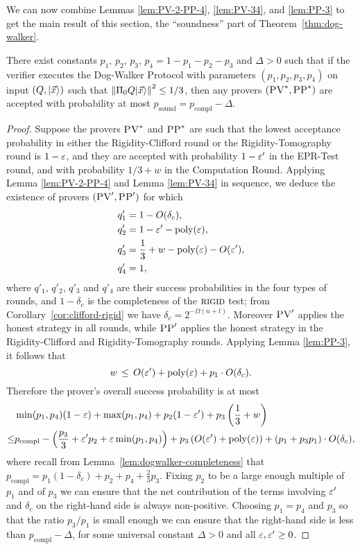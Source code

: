 We can now combine Lemmas \ref{lem:PV-2-PP-4}, \ref{lem:PV-34}, and \ref{lem:PP-3} to get the main result of this section, the ``soundness'' part of Theorem~\ref{thm:dog-walker}.

\begin{lemma}\label{lem:dogwalker-soundness}
 There exist constants $p_1$, $p_2$, $p_3$, $p_4=1-p_1-p_2-p_3$ and $\Delta>0$ such that if the verifier executes the Dog-Walker Protocol with parameters $(p_1,p_2,p_3,p_4)$ on input $(Q,|\vec{x}\rangle)$ such that $\left\|\Pi_0 Q|\vec{x}\rangle\right\|^2\leq 1/3$, then any provers $(\textsc{PV}^*,\textsc{PP}^*)$ are accepted with probability at most $p_{\mathrm{sound}}=p_{\mathrm{compl}}-\Delta$. 
\end{lemma}

\begin{proof}
Suppose the provers $\textsc{PV}^*$ and $\textsc{PP}^*$ are such that the lowest acceptance probability in either the Rigidity-Clifford round or the Rigidity-Tomography round is $1- \varepsilon$, and they are accepted with probability $1-\varepsilon'$ in the EPR-Test round, and with probability $1/3+w$ in the Computation Round. Applying  Lemma \ref{lem:PV-2-PP-4} and Lemma \ref{lem:PV-34} in sequence, we deduce the existence of provers $(\textsc{PV}',\textsc{PP}')$ for which
\begin{align*}
q_1' &= 1- O(\delta_c), \\  q_2' &= 1-\varepsilon'- \operatorname{poly}(\varepsilon), \\ q_3' &= \frac13+w-
  \operatorname{poly}(\varepsilon)-O(\varepsilon'),\\ q_4' &= 1,
\end{align*}
where $q'_1$, $q'_2$, $q'_3$ and $q'_4$ are their success probabilities in the
  four types of rounds, and $1-\delta_c$ is the completeness of the
  $\textsc{rigid}$ test; from Corollary~\ref{cor:clifford-rigid} we have $\delta_c = 2^{-\Omega(n+t)}$. Moreover $\textsc{PV}'$ applies the honest strategy in all rounds, while $\textsc{PP}'$ applies the honest strategy in the Rigidity-Clifford and Rigidity-Tomography rounds. Applying Lemma \ref{lem:PP-3}, it follows that 
$$w \,\leq\, O(\varepsilon') + \operatorname{poly}(\varepsilon) +p_1 \cdot O(\delta_c).$$
Therefore the prover's overall success probability is at most 
\begin{align*}
& \min(p_1,p_4)(1-\varepsilon)+\max(p_1,p_4) + p_2(1-\varepsilon')+p_3\left(\frac{1}{3}+w\right) \\
\leq & p_{\mathrm{compl}} - \left( \frac{p_3}{3} + \varepsilon' p_2+\varepsilon\min(p_1,p_4)\right)+ p_3\left(O(\varepsilon')+\operatorname{poly}(\varepsilon)\right)+ (p_1 + p_3p_1) \cdot O(\delta_c),
\end{align*}
where recall from Lemma~\ref{lem:dogwalker-completeness} that
  $p_{\mathrm{compl}} =  p_1(1-\delta_c)+p_2+p_4+\frac{2}{3}p_3$. Fixing $p_2$
  to be a large enough multiple of $p_1$ and of $p_3$ we can ensure that the net contribution
  of the terms involving $\varepsilon'$ and $\delta_c$ on the right-hand side is always
  non-positive. Choosing $p_1=p_4$ and $p_3$ so that the ratio $p_3/p_1$ is small
  enough we can ensure that the right-hand side is less than $p_{\mathrm{compl}}
  -\Delta$, for some universal constant $\Delta>0$ and all $\varepsilon,\varepsilon'\geq 0$.
\end{proof}



